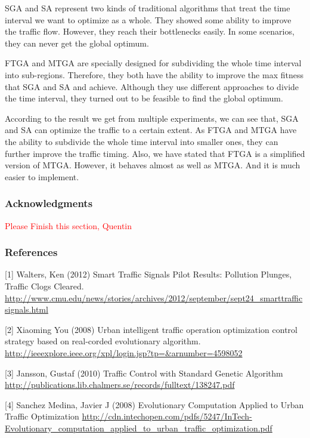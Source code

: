 \documentclass{article} %
\begin{document}
SGA and SA represent two kinds of traditional algorithms that treat the time interval we want to optimize as a whole. They showed some ability to improve the traffic flow. However, they reach their bottlenecks easily. In some scenarios, they can never get the global optimum. 

FTGA and MTGA are specially designed for subdividing the whole time interval into sub-regions. Therefore, they both have the ability to improve the max fitness that SGA and SA and achieve. Although they use different approaches to divide the time interval, they turned out to be feasible to find the global optimum. 

According to the result we get from multiple experiments, we can see that, SGA and SA can optimize the traffic to a certain extent. As FTGA and MTGA have the ability to subdivide the whole time interval into smaller ones, they can further improve the traffic timing. Also, we have stated that FTGA is a simplified version of MTGA. However, it behaves almost as well as MTGA. And it is much easier to implement.


\subsubsection*{Acknowledgments}

\textcolor{red}{Please Finish this section, Quentin}

\subsubsection*{References}

\small{
[1] Walters, Ken (2012) Smart Traffic Signals Pilot Results: Pollution Plunges, Traffic Clogs Cleared. \url{http://www.cmu.edu/news/stories/archives/2012/september/sept24_smarttrafficsignals.html}

[2] Xiaoming You (2008) Urban intelligent traffic operation optimization control strategy based on real-corded evolutionary algorithm. \url{http://ieeexplore.ieee.org/xpl/login.jsp?tp=&arnumber=4598052}

[3] Jansson, Gustaf (2010) Traffic Control with Standard Genetic Algorithm \url{http://publications.lib.chalmers.se/records/fulltext/138247.pdf}

[4] Sanchez Medina, Javier J (2008) Evolutionary Computation Applied to Urban Traffic Optimization \url{http://cdn.intechopen.com/pdfs/5247/InTech-Evolutionary_computation_applied_to_urban_traffic_optimization.pdf}
}
\end{document}
